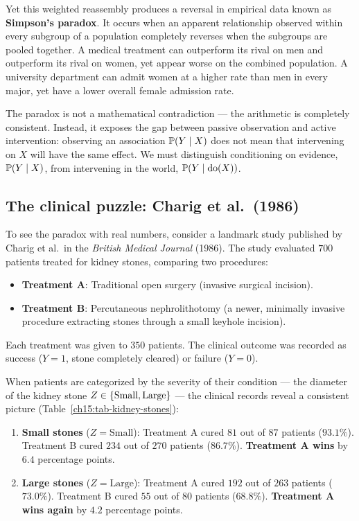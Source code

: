 Yet this weighted reassembly produces a reversal in empirical data known as \textbf{Simpson's paradox}. It occurs when an apparent relationship observed within every subgroup of a population completely reverses when the subgroups are pooled together. A medical treatment can outperform its rival on men and outperform its rival on women, yet appear worse on the combined population. A university department can admit women at a higher rate than men in every major, yet have a lower overall female admission rate.

The paradox is not a mathematical contradiction --- the arithmetic is completely consistent. Instead, it exposes the gap between passive observation and active intervention: observing an association $\operatorname{\mathbb{P}}(Y \mid X)$ does not mean that intervening on $X$ will have the same effect. We must distinguish conditioning on evidence, $\operatorname{\mathbb{P}}(Y \mid X)$, from intervening in the world, $\operatorname{\mathbb{P}}(Y \mid \operatorname{do}(X))$.

\subsection{The clinical puzzle: Charig et al.~(1986)}
\label{ch15:kidney-stones}

To see the paradox with real numbers, consider a landmark study published by Charig et al.~in the \emph{British Medical Journal} (1986). The study evaluated $700$ patients treated for kidney stones, comparing two procedures:
\begin{itemize}
  \item \textbf{Treatment A}: Traditional open surgery (invasive surgical incision).
  \item \textbf{Treatment B}: Percutaneous nephrolithotomy (a newer, minimally invasive procedure extracting stones through a small keyhole incision).
\end{itemize}
Each treatment was given to $350$ patients. The clinical outcome was recorded as success ($Y = 1$, stone completely cleared) or failure ($Y = 0$).

When patients are categorized by the severity of their condition --- the diameter of the kidney stone $Z \in \{\text{Small}, \text{Large}\}$ --- the clinical records reveal a consistent picture (Table~\ref{ch15:tab-kidney-stones}):
\begin{enumerate}
  \item \textbf{Small stones} ($Z = \text{Small}$): Treatment A cured $81$ out of $87$ patients ($93.1\%$). Treatment B cured $234$ out of $270$ patients ($86.7\%$). \textbf{Treatment A wins} by $6.4$ percentage points.
  \item \textbf{Large stones} ($Z = \text{Large}$): Treatment A cured $192$ out of $263$ patients ($73.0\%$). Treatment B cured $55$ out of $80$ patients ($68.8\%$). \textbf{Treatment A wins again} by $4.2$ percentage points.
\end{enumerate}

